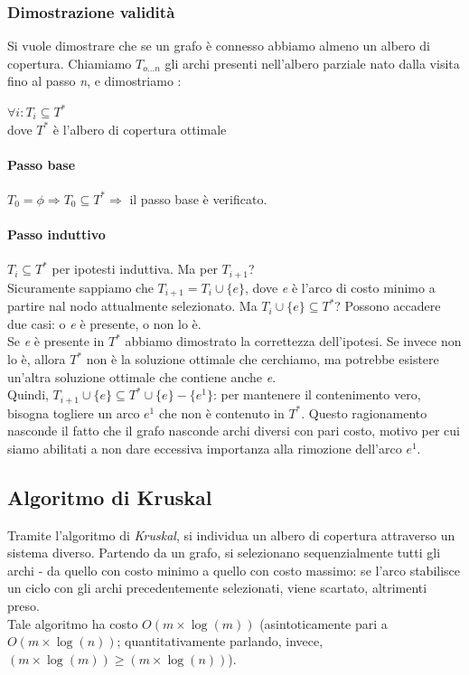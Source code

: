 \subsubsection{Dimostrazione validità}
Si vuole dimostrare che se un grafo è connesso abbiamo almeno un albero di copertura.
Chiamiamo $T_{o\ldots n}$ gli archi presenti nell'albero parziale nato dalla visita fino al passo \textit{n}, e dimostriamo :
\begin{center}
	$\forall i : T_{i} \subseteq T^*$ \\
	dove $T^*$ è l'albero di copertura ottimale
\end{center}
\paragraph{Passo base}
$T_{0} = \phi \Rightarrow T_{0} \subseteq T^* \Rightarrow$ il passo base è verificato.
\paragraph{Passo induttivo}
$T_{i} \subseteq T^*$ per ipotesti induttiva. Ma per $T_{i+1}$? \\
Sicuramente sappiamo che $T_{i+1} = T_{i} \cup \{e\}$, dove \textit{e} è l'arco di costo minimo a partire nal nodo attualmente selezionato. Ma $T_{i} \cup \{e\} \subseteq T^*$? Possono accadere due casi: o \textit{e} è presente, o non lo è. \\
Se \textit{e} è presente in $T^*$ abbiamo dimostrato la correttezza dell'ipotesi. Se invece non lo è, allora $T^*$ non è la soluzione ottimale che cerchiamo, ma potrebbe esistere un'altra soluzione ottimale che contiene anche \textit{e}. \\
Quindi, $T_{i+1} \cup \{e\} \subseteq T^* \cup \{e\} - \{e^1\}$: per mantenere il contenimento vero, bisogna togliere un arco $e^1$ che non è contenuto in $T^*$.
Questo ragionamento nasconde il fatto che il grafo nasconde archi diversi con pari costo, motivo per cui siamo abilitati a non dare eccessiva importanza alla rimozione dell'arco $e^1$.

\subsection{Algoritmo di Kruskal}
Tramite l'algoritmo di \textit{Kruskal}, si individua un albero di copertura attraverso un sistema diverso. Partendo da un grafo, si selezionano sequenzialmente tutti gli archi - da quello con costo minimo a quello con costo massimo: se l'arco stabilisce un ciclo con gli archi precedentemente selezionati, viene scartato, altrimenti preso. \\
Tale algoritmo ha costo $O(m\times \log(m))$ (asintoticamente pari a $O(m\times \log(n))$; quantitativamente parlando, invece, $(m\times \log(m)) \geq (m\times \log(n))$).

